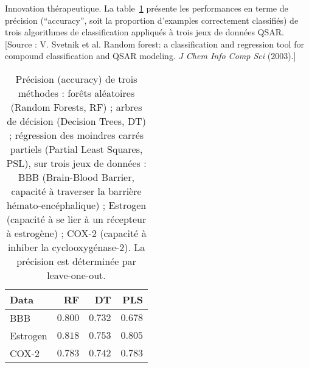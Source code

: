 \documentclass[11pt,addpoints]{exam}
\begin{document}
\begin{questions}

\question[2] Innovation th\'erapeutique. La table~\ref{tab:chemoinformatics} pr\'esente les performances en terme de pr\'ecision (``accuracy'', soit la proportion d'examples correctement classifi\'es) de trois algorithmes de classification appliqu\'es \`a trois jeux de donn\'ees QSAR. [Source : V. Svetnik et al. Random forest: a classification and regression tool for compound classification and QSAR modeling. {\it J Chem Info Comp Sci} (2003).]
 
\begin{table}
  \centering
  \begin{tabular}{|l|r|r|r|} \hline
    Data & RF & DT & PLS \\ \hline
    BBB & $0.800$ & $0.732$ & $0.678$ \\
    Estrogen & $0.818$ & $0.753$ & $0.805$ \\
    COX-2 & $0.783$ & $0.742$ & $0.783$ \\ \hline
  \end{tabular}
  \caption{Pr\'ecision (accuracy) de trois m\'ethodes : for\^ets al\'eatoires (Random Forests, RF) ; arbres de d\'ecision (Decision Trees, DT) ; r\'egression des moindres carr\'es partiels (Partial Least Squares, PSL), sur trois jeux de donn\'ees : BBB (Brain-Blood Barrier, capacit\'e \`a traverser la barri\`ere h\'emato-enc\'ephalique) ; Estrogen (capacit\'e \`a se lier \`a un r\'ecepteur \`a estrog\`ene) ; COX-2 (capacit\'e \`a inhiber la cyclooxyg\'enase-2). La pr\'ecision est d\'etermin\'ee par leave-one-out.}
  \label{tab:chemoinformatics}
\end{table}

\end{questions}
\end{document}
